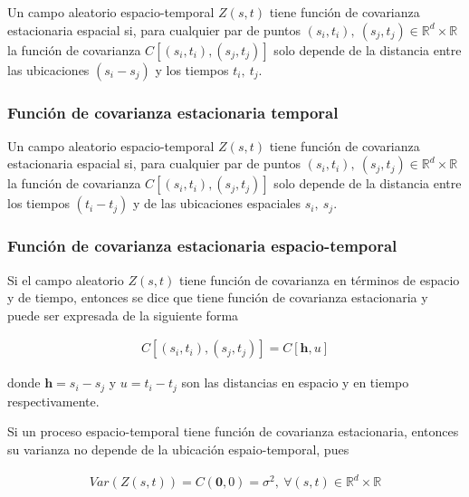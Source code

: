 \documentclass[
]{book}
\begin{document}
Un campo aleatorio espacio-temporal \(Z(s,t)\) tiene función de covarianza estacionaria espacial si, para cualquier par de puntos \((s_i,t_i),\ (s_j,t_j) \in \mathbb{R}^d \times \mathbb{R}\) la función de covarianza \(C[(s_i,t_i),(s_j,t_j)]\) solo depende de la distancia entre las ubicaciones \((s_i-s_j)\) y los tiempos \(t_i,\ t_j\).

\hypertarget{funciuxf3n-de-covarianza-estacionaria-temporal}{%
\subsubsection*{Función de covarianza estacionaria temporal}\label{funciuxf3n-de-covarianza-estacionaria-temporal}}

Un campo aleatorio espacio-temporal \(Z(s,t)\) tiene función de covarianza estacionaria espacial si, para cualquier par de puntos \((s_i,t_i),\ (s_j,t_j) \in \mathbb{R}^d \times \mathbb{R}\) la función de covarianza \(C[(s_i,t_i),(s_j,t_j)]\) solo depende de la distancia entre los tiempos \((t_i-t_j)\) y de las ubicaciones espaciales \(s_i,\ s_j\).

\hypertarget{funciuxf3n-de-covarianza-estacionaria-espacio-temporal}{%
\subsubsection*{Función de covarianza estacionaria espacio-temporal}\label{funciuxf3n-de-covarianza-estacionaria-espacio-temporal}}

Si el campo aleatorio \(Z(s,t)\) tiene función de covarianza en términos de espacio y de tiempo, entonces se dice que tiene función de covarianza estacionaria y puede ser expresada de la siguiente forma

\begin{align}
C[(s_i,t_i),(s_j,t_j)]=C[\textbf{h},u]
\end{align}

donde \(\textbf{h}=s_i-s_j\) y \(u=t_i-t_j\) son las distancias en espacio y en tiempo respectivamente.

Si un proceso espacio-temporal tiene función de covarianza estacionaria, entonces su varianza no depende de la ubicación espaio-temporal, pues

\begin{align}
Var(Z(s,t))=C(\boldsymbol 0,0)=\sigma^2,\ \forall (s,t) \in \mathbb{R}^d \times \mathbb{R}
\end{align}
\end{document}
